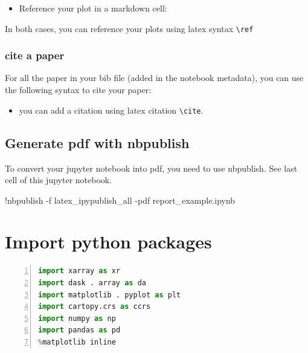 \documentclass[10pt,parskip=half,
	toc=sectionentrywithdots,
	bibliography=totocnumbered,
	captions=tableheading,numbers=noendperiod]{scrartcl}
\providecommand{\tightlist}{%
  \setlength{\itemsep}{0pt}\setlength{\parskip}{0pt}}
\newenvironment{Shaded}{}{}
\newcommand{\NormalTok}[1]{{#1}}
\newcommand{\ExtensionTok}[1]{{#1}}
\begin{document}
\begin{itemize}
\tightlist
\item
  Reference your plot in a markdown cell:
\end{itemize}

In both cases, you can reference your plots using latex syntax
\texttt{\textbackslash{}ref}

\subsubsection{cite a paper}\label{cite-a-paper}

For all the paper in your bib file (added in the notebook metadata), you
can use the following syntax to cite your paper:

\begin{itemize}
\tightlist
\item
  you can add a citation using latex citation
  \texttt{\textbackslash{}cite}.
\end{itemize}

\subsection{Generate pdf with
nbpublish}\label{generate-pdf-with-nbpublish}

To convert your jupyter notebook into pdf, you need to use nbpublish.
See last cell of this jupyter notebook.

\begin{Shaded}
\begin{Highlighting}[]
\NormalTok{!}\ExtensionTok{nbpublish}\NormalTok{ -f latex_ipypublish_all -pdf report_example.ipynb}
\end{Highlighting}
\end{Shaded}

\section{Import python packages}\label{import-python-packages}

\begin{lstlisting}[language=Python,numbers=left,xleftmargin=20pt,xrightmargin=5pt,belowskip=5pt,aboveskip=5pt]
import xarray as xr
import dask . array as da
import matplotlib . pyplot as plt
import cartopy.crs as ccrs
import numpy as np
import pandas as pd
%matplotlib inline

\end{lstlisting}
\end{document}

